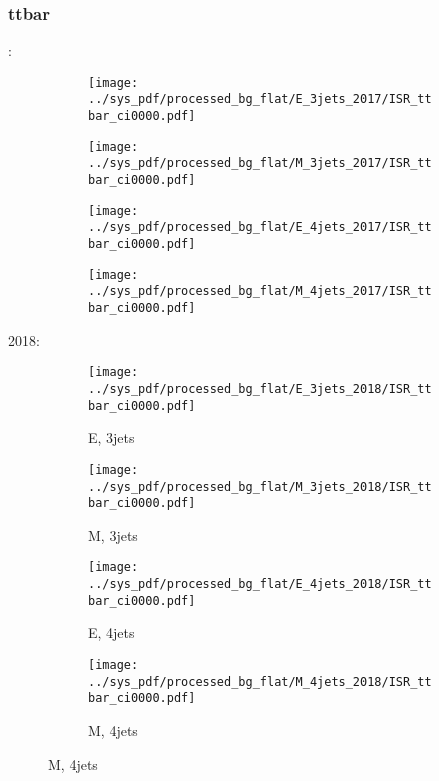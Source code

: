 \documentclass{beamer}
\begin{document}
\begin{frame}
\frametitle{ttbar}
\fontsize{5}{1}:
\begin{figure}
\centering
\begin{subfigure}[b]{0.24\textwidth}
\texttt{[image: ../sys\_pdf/processed\_bg\_flat/E\_3jets\_2017/ISR\_ttbar\_ci0000.pdf]}
\end{subfigure}
\begin{subfigure}[b]{0.24\textwidth}
\texttt{[image: ../sys\_pdf/processed\_bg\_flat/M\_3jets\_2017/ISR\_ttbar\_ci0000.pdf]}
\end{subfigure}
\begin{subfigure}[b]{0.24\textwidth}
\texttt{[image: ../sys\_pdf/processed\_bg\_flat/E\_4jets\_2017/ISR\_ttbar\_ci0000.pdf]}
\end{subfigure}
\begin{subfigure}[b]{0.24\textwidth}
\texttt{[image: ../sys\_pdf/processed\_bg\_flat/M\_4jets\_2017/ISR\_ttbar\_ci0000.pdf]}
\end{subfigure}
\end{figure}
2018:
\begin{figure}
\centering
\begin{subfigure}[b]{0.24\textwidth}
\texttt{[image: ../sys\_pdf/processed\_bg\_flat/E\_3jets\_2018/ISR\_ttbar\_ci0000.pdf]}
\captionsetup{font=tiny}
\caption{E, 3jets}
\end{subfigure}
\begin{subfigure}[b]{0.24\textwidth}
\texttt{[image: ../sys\_pdf/processed\_bg\_flat/M\_3jets\_2018/ISR\_ttbar\_ci0000.pdf]}
\captionsetup{font=tiny}
\caption{M, 3jets}
\end{subfigure}
\begin{subfigure}[b]{0.24\textwidth}
\texttt{[image: ../sys\_pdf/processed\_bg\_flat/E\_4jets\_2018/ISR\_ttbar\_ci0000.pdf]}
\captionsetup{font=tiny}
\caption{E, 4jets}
\end{subfigure}
\begin{subfigure}[b]{0.24\textwidth}
\texttt{[image: ../sys\_pdf/processed\_bg\_flat/M\_4jets\_2018/ISR\_ttbar\_ci0000.pdf]}
\captionsetup{font=tiny}
\caption{M, 4jets}
\end{subfigure}
\end{figure}
\end{frame}
\end{document}
